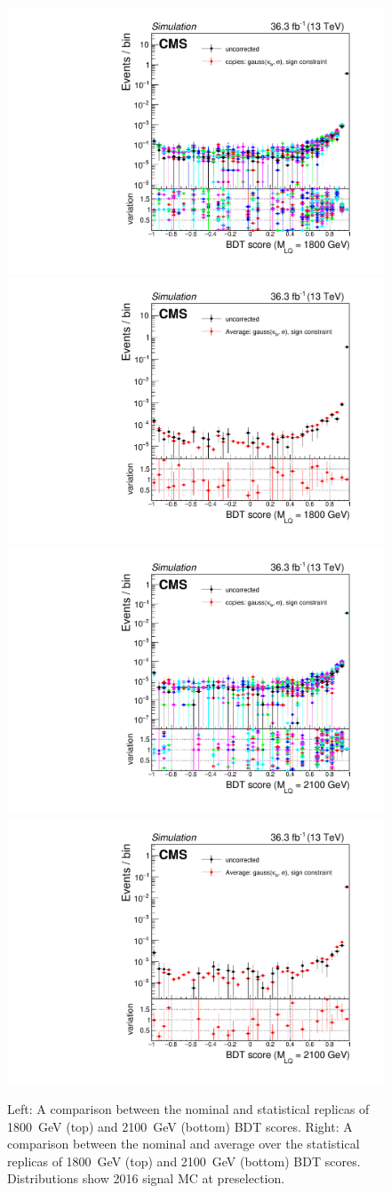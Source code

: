 \begin{figure}[H]
    \centering
    {\includegraphics[width=.49\textwidth]{Images/Analysis/GEScaleSystStudy/StudyPlots_2016/SignalM1800/Copies/preSel/GEScaleSystStudyPlot_2016_SignalM1800_Copies_preSel_LQToBMu_pair_uubj_BDT_discrim_M1800.pdf}}
    {\includegraphics[width=.49\textwidth]{Images/Analysis/GEScaleSystStudy/StudyPlots_2016/SignalM1800/Averages/preSel/GEScaleSystStudyPlot_2016_SignalM1800_Average_preSel_LQToBMu_pair_uubj_BDT_discrim_M1800.pdf}}
    {\includegraphics[width=.49\textwidth]{Images/Analysis/GEScaleSystStudy/StudyPlots_2016/SignalM2100/Copies/preSel/GEScaleSystStudyPlot_2016_SignalM2100_Copies_preSel_LQToBMu_pair_uubj_BDT_discrim_M2100.pdf}}
    {\includegraphics[width=.49\textwidth]{Images/Analysis/GEScaleSystStudy/StudyPlots_2016/SignalM2100/Averages/preSel/GEScaleSystStudyPlot_2016_SignalM2100_Average_preSel_LQToBMu_pair_uubj_BDT_discrim_M2100.pdf}}
    \caption{Left: A comparison between the nominal and statistical replicas of \SI{1800}{GeV} (top) and \SI{2100}{GeV} (bottom) BDT scores. Right: A comparison between the nominal and average over the statistical replicas of \SI{1800}{GeV} (top) and \SI{2100}{GeV} (bottom) BDT scores. Distributions show 2016 signal MC at preselection.}
    \label{figapp:gesysBDTscoresSig2}
\end{figure}

